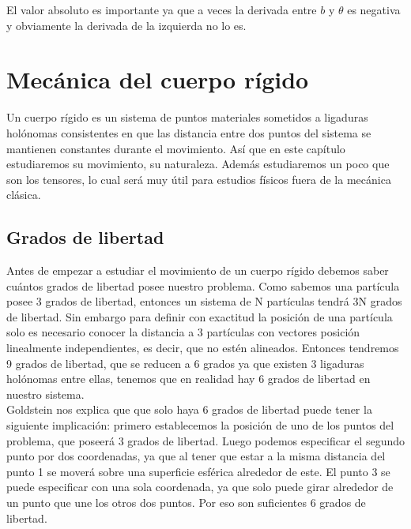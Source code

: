 \documentclass[12pt,a4paper]{book}
\begin{document}
El valor absoluto es importante ya que a veces la derivada entre $b$ y $\theta$ es negativa y obviamente la derivada de la izquierda no lo es. 




\chapter{Mecánica del cuerpo rígido}

Un cuerpo rígido es un sistema de puntos materiales sometidos a ligaduras holónomas consistentes en que las distancia entre dos puntos del sistema se mantienen constantes durante el movimiento. Así que en este capítulo estudiaremos su movimiento, su naturaleza. Además estudiaremos un poco que son los tensores, lo cual será muy útil para estudios físicos fuera de la mecánica clásica.

\section{Grados de libertad}

Antes de empezar a estudiar el movimiento de un cuerpo rígido debemos saber cuántos grados de libertad posee nuestro problema. Como sabemos una partícula posee 3 grados de libertad, entonces un sistema de N partículas tendrá 3N grados de libertad. Sin embargo para definir con exactitud la posición de una partícula solo es necesario conocer la distancia a 3 partículas con vectores posición linealmente independientes, es decir, que no estén alineados. Entonces tendremos 9 grados de libertad, que se reducen a 6 grados ya que existen 3 ligaduras holónomas entre ellas, tenemos que en realidad hay 6 grados de libertad en nuestro sistema. \\

Goldstein nos explica que que solo haya 6 grados de libertad puede tener la siguiente implicación: primero establecemos la posición de uno de los puntos del problema, que poseerá 3 grados de libertad. Luego podemos especificar el segundo punto por dos coordenadas, ya que al tener que estar a la misma distancia del punto 1 se moverá sobre una superficie esférica alrededor de este. El punto 3 se puede especificar con una sola coordenada, ya que solo puede girar alrededor de un punto que une los otros dos puntos.  Por eso son suficientes 6 grados de libertad. \\
\end{document}
